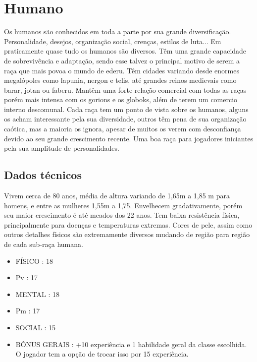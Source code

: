 \section{Humano}

Os humanos são conhecidos em toda a parte por sua grande diversificação. Personalidade, desejos, organização social, crenças, estilos de luta... Em praticamente quase tudo os humanos são diversos. Têm uma grande capacidade de sobrevivência e adaptação, sendo esse talvez o principal motivo de serem a raça que mais povoa o mundo de ederu. Têm cidades variando desde enormes megalópoles como lapunia, nergon e telis, até grandes reinos medievais como barar, jotan ou faberu. Mantêm uma forte relação comercial com todas as raças porém mais intensa com os gorions e os globoks, além de terem um comercio interno descomunal. Cada raça tem um ponto de vista sobre os humanos, alguns os acham interessante pela sua diversidade, outros têm pena de sua organização caótica, mas a maioria os ignora, apesar de muitos os verem com desconfiança devido ao seu grande crescimento recente. Uma boa raça para jogadores iniciantes pela sua amplitude de personalidades.

\subsection{Dados técnicos}

Vivem cerca de 80 anos, média de altura variando de 1,65m a 1,85 m para homens, e entre as mulheres 1,55m a 1,75. Envelhecem gradativamente, porém seu maior crescimento é até meados dos 22 anos. Tem baixa resistência física, principalmente para doenças e temperaturas extremas. Cores de pele, assim como outros detalhes físicos são extremamente diversos mudando de região para região de cada sub-raça humana.


\begin{itemize}
	\item FÍSICO : 18
	\item Pv : 17 

	\item MENTAL : 18
	\item Pm : 17

	\item SOCIAL : 15

	\item BÔNUS GERAIS : +10 experiência e 1 habilidade geral da classe escolhida. O jogador tem a opção de trocar isso por 15 experiência.
\end{itemize}


